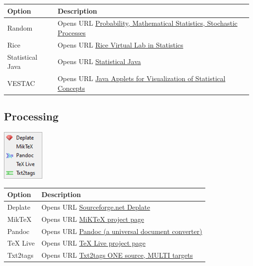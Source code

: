 \begin{scriptsize}
\begin{tabularx}{\textwidth}{>{\hsize=0.3\hsize}X>{\hsize=0.7\hsize}X}\\
    \hline
    \textbf{Option} & \textbf{Description} \\
    \hline
    Random & Opens URL \href{https://www.randomservices.org/random/}
     {Probability, Mathematical Statistics, Stochastic Processes} \\
    Rice & Opens URL \href{http://onlinestatbook.com/rvls.html}{Rice Virtual Lab in Statistics} \\
    Statistical Java & Opens URL \href{http://www.causeweb.org/repository/statjava/}{Statistical Java} \\
    VESTAC & Opens URL \href{http://lstat.kuleuven.be/newjava/vestac/}
     {Java Applets for Visualization of Statistical Concepts} \\
    \hline
  \end{tabularx}
\end{scriptsize}


\newpage
\hypertarget{menu_web_processing}{}
\subsection{Processing}

\includegraphics[scale=0.8]{./res/menu_web_processing.png}\\

\begin{scriptsize}
  \begin{tabularx}{\textwidth}{>{\hsize=0.3\hsize}X>{\hsize=0.7\hsize}X}\\
    \hline
    \textbf{Option} & \textbf{Description} \\
    \hline
    Deplate & Opens URL \href{http://deplate.sourceforge.net/index.php}{Sourceforge.net Deplate} \\
    MikTeX & Opens URL \href{http://miktex.org/}{MiKTeX project page} \\
    Pandoc & Opens URL \href{http://johnmacfarlane.net/pandoc/}{Pandoc (a universal document converter)} \\
    TeX Live & Opens URL \href{https://tug.org/texlive/}{TeX Live project page} \\
    Txt2tags & Opens URL \href{http://txt2tags.sourceforge.net/}{Txt2tags ONE source, MULTI targets} \\
    \hline
  \end{tabularx}
\end{scriptsize}
